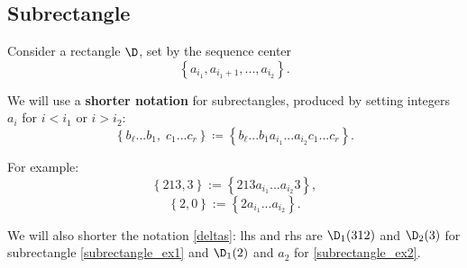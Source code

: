 \subsection{Subrectangle}
Consider a rectangle $\D$, set by the sequence center
\begin{equation*}
	\left\{ a_{i_1}, a_{i_1 + 1}, ..., a_{i_2} \right\}.
\end{equation*}

We will use a \textbf{shorter notation} for subrectangles, produced by setting integers
$a_i$ for $i < i_1$ or $i > i_2$:
\begin{equation*}
	\left\{ b_\ell...b_1,\; c_1...c_r\right\} \coloneqq
	\left\{ b_\ell...b_1 a_{i_1} ... a_{i_2} c_1...c_r\right\}.
\end{equation*}

For example:
\begin{equation}\tag{ex.1}\label{subrectangle_ex1}
	\left\{213, 3\right\} := \left\{ 213 a_{i_1} ... a_{i_2} 3\right\},
\end{equation}
\begin{equation}\tag{ex.2}\label{subrectangle_ex2}
	\left\{2, 0\right\} := \left\{ 2 a_{i_1} ... a_{i_2}  \right\}.
\end{equation}

We will also shorter the notation \ref{deltas}: lhs and rhs are $\D_1(312)$ and $\D_2(3)$ for subrectangle \ref{subrectangle_ex1} and $\D_1(2)$ and $a_2$ for \ref{subrectangle_ex2}.
